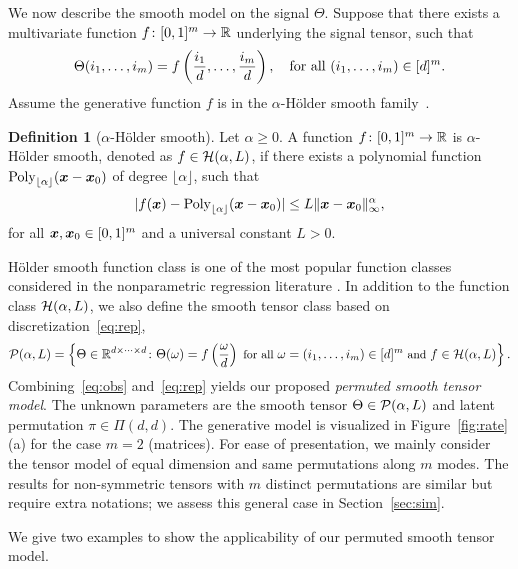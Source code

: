 \documentclass[12pt]{article}
\theoremstyle{definition}
\newtheorem{defn}{Definition}
\begin{document}
We now describe the smooth model on the signal $\Theta$. Suppose that there exists a multivariate function $f\colon [0,1]^m\rightarrow \mathbb{R}$ underlying the signal tensor, such that
\begin{align}\label{eq:rep}
\Theta(i_1,\ldots,i_m) = f\left({i_1\over d},\ldots,{i_m\over d}\right), \quad \text{for all }(i_1,\ldots,i_m)\in[d]^m.
\end{align}
Assume the generative function $f$ is in the $\alpha$-H\"older smooth family~\cite{wasserman2006all,tsybakov2009introduction}. 
\begin{defn}[$\alpha$-H\"older smooth]
Let $\alpha\geq 0$. A function $f\colon [0,1]^m\rightarrow \mathbb{R}$ is $\alpha$-H\"older smooth, denoted as $f\in\mathcal{H}(\alpha,L)$, if there exists a polynomial function $\textup{Poly}_{\lfloor \alpha\rfloor}(\bm x-\bm x_0)$ of degree  $\lfloor \alpha\rfloor$, such that 
\begin{align}\label{eq:defn}
    |f(\bm x) - \textup{Poly}_{\lfloor \alpha\rfloor}(\bm x-\bm x_0)| \leq L\|\bm x-\bm x_0\|_\infty^\alpha,
\end{align}
for all $\bm x,\bm x_0\in [0,1]^m$ and a universal constant $L>0.$ 
\end{defn}
H\"older smooth function class is one of the most popular function classes considered in the nonparametric regression literature \citep{klopp2017oracle,gao2015rate}. 
In addition to the function class $\mathcal{H}(\alpha, L)$, we also define the smooth tensor class based on discretization~\eqref{eq:rep}, 
\[
{\small \mathcal{P}(\alpha,L)= \left\{\Theta\in\mathbb{R}^{d\times \cdots \times d} \colon\Theta(\omega) = f\left({\omega \over d}\right) \text{ for all } \omega=(i_1,\ldots,i_m) \in[d]^m \text{ and } f\in\mathcal{H}(\alpha,L)\right\}.}
\]
Combining~\eqref{eq:obs} and~\eqref{eq:rep} yields our proposed \emph{permuted smooth tensor model}. 
The unknown parameters are the smooth tensor $\Theta \in \mathcal{P}(\alpha, L)$ and latent permutation $\pi \in \Pi(d,d)$. The generative model is visualized in Figure~\ref{fig:rate}(a) for the case $m=2$ (matrices). For ease of presentation, we mainly consider the tensor model of equal dimension and same permutations along $m$ modes. The results for non-symmetric tensors with $m$ distinct permutations are similar but require extra notations; we assess this general case in Section~\ref{sec:sim}. 

We give two examples to show the applicability of our permuted smooth tensor model. 
\end{document}
